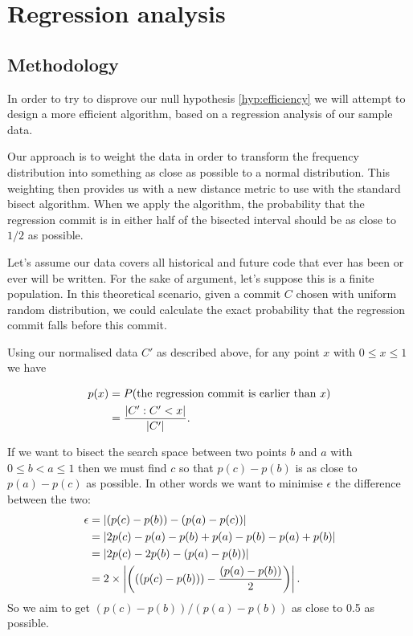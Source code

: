 \documentclass[10pt,journal,compsoc]{IEEEtran}
\begin{document}
\section{Regression analysis}
\label{section-regression}

\subsection{Methodology}

In order to try to disprove our null hypothesis \ref{hyp:efficiency} we will attempt to design a more efficient algorithm, based on a regression analysis of our sample data.

Our approach is to weight the data in order to transform the frequency distribution into something as close as possible to a normal distribution. This weighting then provides us with a new distance metric to use with the standard bisect algorithm. When we apply the algorithm, the probability that the regression commit is in either half of the bisected interval should be as close to $1/2$ as possible.

Let's assume our data covers all historical and future code that ever has been or ever will be written. For the sake of argument, let's suppose this is a finite population. In this theoretical scenario, given a commit $C$ chosen with uniform random distribution, we could calculate the exact probability that the regression commit falls before this commit.

Using our normalised data $C'$ as described above, for any point $x$ with $0 \le x \le 1$ we have

\begin{align*}
p(x) & = P( \text{the regression commit is earlier than } x) \\
    & = \frac{\left|  C' : C' < x  \right|}{ \left|  C'  \right|} .
\end{align*}

If we want to bisect the search space between two points $b$ and $a$ with $0 \le b < a \le 1$ then we must find $c$ so that $p(c) - p(b)$ is as close to $p(a) - p(c)$ as possible. In other words we want to minimise $\epsilon$ the difference between the two:
\begin{align*}
\epsilon & = \left| (p(c) - p(b)) - (p(a) - p(c)) \right| \\
         & = \left| 2p(c) - p(a) - p(b) + p(a) - p(b) - p(a) + p(b) \right| \\
         & = \left| 2p(c) - 2p(b) - (p(a) - p(b)) \right| \\
         & = 2 \times \left| \left(((p(c) - p(b))) - \frac{(p(a) - p(b))}{2} \right) \right| .
\end{align*}
So we aim to get $(p(c) - p(b)) / (p(a) - p(b))$ as close to 0.5 as possible.
\end{document}
